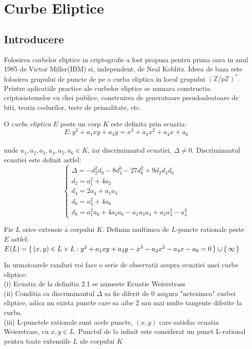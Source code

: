 \chapter{Curbe Eliptice} 
\section{Introducere}
\label{sec:sec01}
Folosirea curbelor eliptice in criptografie a fost propusa pentru prima oara in anul 1985 de Victor Miller(IBM) si, independent, de Neal Koblitz. Ideea de baza este folosirea grupului de puncte de pe o curba eliptica in locul grupului $(\mathbb{Z}/p\mathbb{Z})^{*}$. Printre aplicatiile practice ale curbelor eliptice se numara constructia criptosistemelor cu chei publice, construirea de generatoare pseudoaleatoare de biti, teoria codurilor, teste de primalitate, etc.
\begin{dfn}
O \textit{curba eliptica} $E$ peste un corp $K$ este definita prin ecuatia:
$$E : y^2 + a_1xy + a_3y = x^3 + a_2x^{2} + a_4x + a_6$$ 
\\unde $a_1, a_2, a_3, a_4, a_5, a_6\in K$, iar discriminantul ecuatiei, $\Delta \neq 0$. Discriminantul ecuatiei este definit astfel:
$$ \begin{cases}
\Delta = -d_2^{2}d_8 - 8d_4^{3} - 27d_6^{2} + 9d_2d_4d_6 \\
d_2 = a_1^{2} + 4a_2 \\
d_4 = 2a_4 + a_1a_3 \\
d_6 = a_3^{2} + 4a_6 \\
d_8 = a_1^{2}a_6 + 4a_2a_6 - a_1a_3a_4 + a_2a_3^{2} - a_4^{2}
\end{cases}$$
\end{dfn}
\begin{dfn}
Fie $L$ orice extensie a corpului $K$. Definim multimea de $L$-puncte rationale peste $E$ astfel: $E(L) = \set {(x, y)\in L\times L: y^2 + a_1xy + a_3y - x^3 - a_2x^{2} - a_4x - a_6 = 0} \cup \set {\infty}$
\end{dfn}
\begin{obs}
In urmatoarele randuri voi face o serie de observatii asupra ecuatiei unei curbe eliptice: \\
(i) Ecuatia de la definitia 2.1 se numeste Ecuatie Weierstrass \\
(ii) Conditia ca discriminantul $\Delta$ sa fie diferit de 0 asigura "netezimea" curbei eliptice, adica nu exista puncte care sa aibe 2 sau mai multe tangente diferite la curba. \\
(iii) L-punctele rationale sunt acele puncte, $(x, y)$ care satisfac ecuatia Weierstrass, cu $x, y \in L$. Punctul de la infinit este considerat un punct L-rational pentru toate extensiile $L$ ale corpului $K$
\end{obs}


